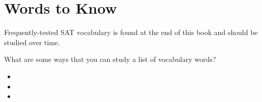 \section{Words to Know}

Frequently-tested SAT vocabulary is found at the end of this book and should be studied over time.

What are some ways that you can study a list of vocabulary words?
\begin{itemize}
\item    
\item    
\item    
\end{itemize}
